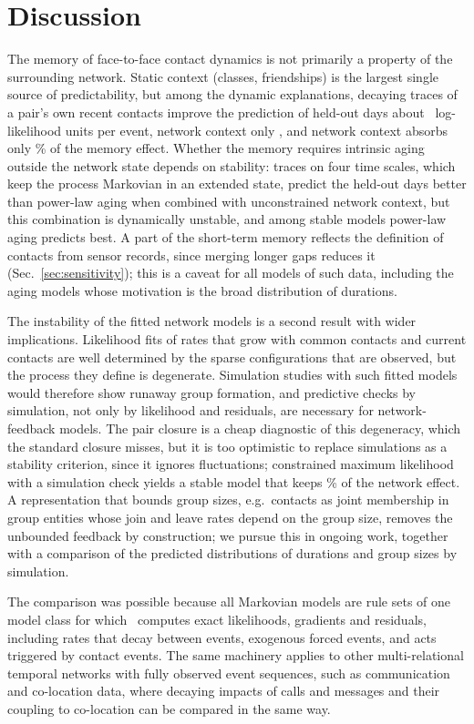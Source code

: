 \section{Discussion}\label{sec:discussion}

The memory of face-to-face contact dynamics is not primarily a property of the surrounding network.
Static context (classes, friendships) is the largest single source of predictability, but among the dynamic explanations, decaying traces of a pair's own recent contacts improve the prediction of held-out days about \GainMemoryAlone\ log-likelihood units per event, network context only \GainNetwork, and network context absorbs only \MemoryAbsorbed\% of the memory effect.
Whether the memory requires intrinsic aging outside the network state depends on stability: traces on four time scales, which keep the process Markovian in an extended state, predict the held-out days better than power-law aging when combined with unconstrained network context, but this combination is dynamically unstable, and among stable models power-law aging predicts best. A part of the short-term memory reflects the definition of contacts from sensor records, since merging longer gaps reduces it (Sec.~\ref{sec:sensitivity}); this is a caveat for all models of such data, including the aging models whose motivation is the broad distribution of durations.

The instability of the fitted network models is a second result with wider implications.
Likelihood fits of rates that grow with common contacts and current contacts are well determined by the sparse configurations that are observed, but the process they define is degenerate.
Simulation studies with such fitted models would therefore show runaway group formation, and predictive checks by simulation, not only by likelihood and residuals, are necessary for network-feedback models.
The pair closure is a cheap diagnostic of this degeneracy, which the standard closure misses, but it is too optimistic to replace simulations as a stability criterion, since it ignores fluctuations; constrained maximum likelihood with a simulation check yields a stable model that keeps \StableRetained\% of the network effect.
A representation that bounds group sizes, e.g.\ contacts as joint membership in group entities whose join and leave rates depend on the group size, removes the unbounded feedback by construction; we pursue this in ongoing work, together with a comparison of the predicted distributions of durations and group sizes by simulation.

The comparison was possible because all Markovian models are rule sets of one model class for which \tricl\ computes exact likelihoods, gradients and residuals, including rates that decay between events, exogenous forced events, and acts triggered by contact events.
The same machinery applies to other multi-relational temporal networks with fully observed event sequences, such as communication and co-location data, where decaying impacts of calls and messages and their coupling to co-location can be compared in the same way.
